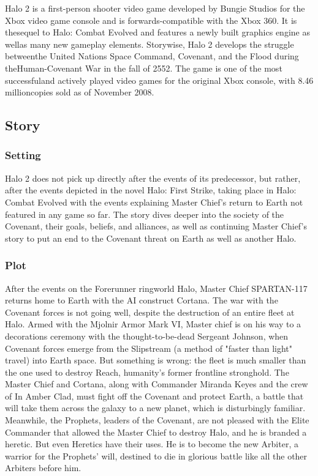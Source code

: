 \documentclass[a4paper,10pt]{book}
\begin{document}
          Halo 2 is a first-person shooter video game developed by Bungie Studios for the Xbox video game console and is forwards-compatible with the Xbox 360. 
          It is thesequel to Halo:  Combat Evolved and features a newly built graphics engine as wellas many new gameplay elements. 
          Storywise, Halo 2 develops the struggle betweenthe United Nations Space Command, Covenant, and the Flood during theHuman-Covenant War in the fall of 2552. 
          The game is one of the most successfuland actively played video games for the original Xbox console, with 8.46 millioncopies sold as of November 2008.
         
 
 \subsection{Story }
 
 \subsubsection{Setting }
 
          Halo 2 does not pick up directly after the events of its predecessor, but rather, after the events depicted in the novel Halo: First Strike, taking place in Halo:
          Combat Evolved with the events explaining Master Chief's return to Earth not featured in any game so far. The story dives deeper into the society of the Covenant,
          their goals, beliefs, and alliances, as well as continuing Master Chief's story to put an end to the Covenant threat on Earth as well as another Halo. 
         
 
 \subsubsection{Plot }
 
          After the events on the Forerunner ringworld Halo, Master Chief SPARTAN-117 returns home to Earth with the AI construct Cortana.
          The war with the Covenant forces is not going well, despite the destruction of an entire fleet at Halo.
          Armed with the Mjolnir Armor Mark VI, Master chief is on his way to a decorations ceremony with the thought-to-be-dead Sergeant Johnson, when Covenant forces emerge 
          from the Slipstream (a method of "faster than light" travel) into Earth space.
          But something is wrong: the fleet is much smaller than the one used to destroy Reach, humanity's former frontline stronghold. The Master Chief and Cortana,
          along with Commander Miranda Keyes and the crew of In Amber Clad, must fight off the Covenant and protect Earth, a battle that will take them across the galaxy to a new planet,
          which is disturbingly familiar. Meanwhile, the Prophets, leaders of the Covenant, are not pleased with the Elite Commander that allowed the Master Chief to destroy Halo, and he is branded a heretic.
          But even Heretics have their uses. He is to become the new Arbiter, a warrior for the Prophets' will, destined to die in glorious battle like all the other Arbiters before him.
         
\end{document}
